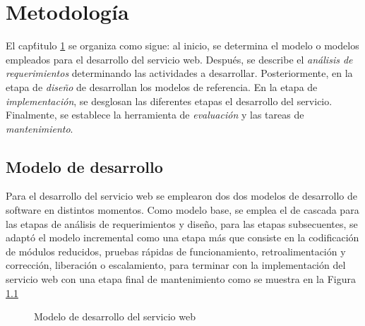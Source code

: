 \renewcommand{\chaptername}{Capitulo}
\chapter{Metodolog\'ia} 
\label{Metodologia}

El cap\'titulo \ref{Metodologia} se organiza como sigue: al inicio, se determina el modelo o modelos empleados para el desarrollo del servicio web. Despu\'es, se describe el \textit{an\'alisis de requerimientos} determinando las actividades a desarrollar. Posteriormente, en la etapa de \textit{diseño} de desarrollan los modelos de referencia. En la etapa de \textit{implementación}, se desglosan las diferentes etapas el desarrollo del servicio. Finalmente, se establece la herramienta de \textit{evaluaci\'on} y las tareas de \textit{mantenimiento}.

\section{Modelo de desarrollo}

Para el desarrollo del servicio web se emplearon dos dos modelos de desarrollo de software en distintos momentos. Como modelo base, se emplea el de cascada \cite{IngDeSW} para las etapas de an\'alisis de requerimientos y diseño, para las etapas subsecuentes, se adapt\'o el modelo incremental como una etapa m\'as que consiste en la codificación de módulos reducidos, pruebas rápidas de funcionamiento, retroalimentación y corrección, liberación o escalamiento, para terminar con la implementaci\'on del servicio web con una etapa final de mantenimiento como se muestra en la Figura \ref{modeloDesarrolloSW}

\begin{figure}[!ht]
	\centering
    \caption{Modelo de desarrollo del servicio web} %
    \label{modeloDesarrolloSW}
\end{figure}

